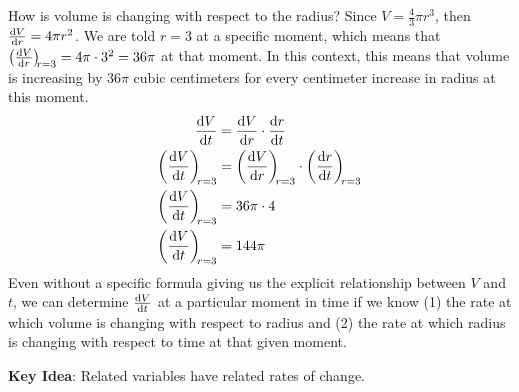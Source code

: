 \documentclass[main]{subfiles}
\begin{document}
\begin{enumerate}
\begin{enumerate}
\begin{solution}
    How is volume is changing with respect to the radius? Since $V = \frac{4}{3} \pi r^3$, then $\diff{V}{r} = 4\pi r^2$. We are told $r=3$ at a specific moment, which means that $\diff{V}{r}[r=3] = 4\pi \cdot 3^2 = 36\pi$ at that moment. In this context, this means that volume is increasing by $36\pi$ cubic centimeters for every centimeter increase in radius at this moment.
    \begin{align*}
        \diff{V}{t}&= \diff{V}{r}\cdot\diff{r}{t}\\
        \diff{V}{t}[r=3]&= \diff{V}{r}[r=3]\cdot\diff{r}{t}[r=3]\\
         \diff{V}{t}[r=3]&= 36\pi\cdot4\\
          \diff{V}{t}[r=3]&= 144\pi \
    \end{align*}
    Even without a specific formula giving us the explicit relationship between $V$ and $t$, we can determine $\diff{V}{t}$ at a particular moment in time if we know (1) the rate at which volume is changing with respect to radius and (2) the rate at which radius is changing with respect to time at that given moment. 
\end{solution}
\end{enumerate}
\end{enumerate}

\pspace{\newpage}

\textbf{Key Idea}: Related variables have related rates of change.
\end{document}
